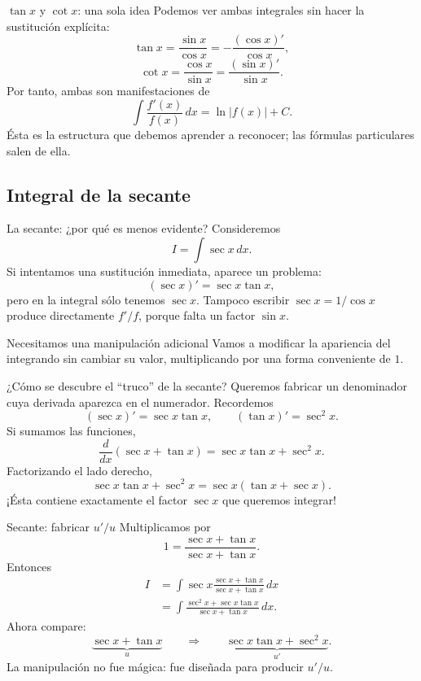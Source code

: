 \documentclass[10pt,aspectratio=169]{beamer}
\begin{document}
\begin{frame}{$\tan x$ y $\cot x$: una sola idea}
Podemos ver ambas integrales sin hacer la sustitución explícita:
\[
\tan x
=\frac{\sin x}{\cos x}
=-\frac{(\cos x)'}{\cos x},
\]
\[
\cot x
=\frac{\cos x}{\sin x}
=\frac{(\sin x)'}{\sin x}.
\]
Por tanto, ambas son manifestaciones de
\[
\boxed{\int\frac{f'(x)}{f(x)}\,dx=\ln|f(x)|+C.}
\]
Ésta es la estructura que debemos aprender a reconocer; las fórmulas particulares salen de ella.
\end{frame}

\subsection{Integral de la secante}
\begin{frame}{La secante: ¿por qué es menos evidente?}
Consideremos
\[
I=\int\sec x\,dx.
\]
Si intentamos una sustitución inmediata, aparece un problema:
\[
(\sec x)'=\sec x\tan x,
\]
pero en la integral sólo tenemos $\sec x$.
\vspace{2mm}
Tampoco escribir $\sec x=1/\cos x$ produce directamente $f'/f$, porque falta un factor $\sin x$.
\begin{alertblock}{Necesitamos una manipulación adicional}
Vamos a modificar la apariencia del integrando sin cambiar su valor, multiplicando por una forma conveniente de $1$.
\end{alertblock}
\end{frame}

\begin{frame}{¿Cómo se descubre el ``truco'' de la secante?}
Queremos fabricar un denominador cuya derivada aparezca en el numerador.
Recordemos
\[
(\sec x)'=\sec x\tan x,
\qquad
(\tan x)'=\sec^2x.
\]
Si sumamos las funciones,
\[
\frac{d}{dx}(\sec x+\tan x)
=\sec x\tan x+\sec^2x.
\]
Factorizando el lado derecho,
\[
\sec x\tan x+\sec^2x
=\sec x(\tan x+\sec x).
\]
¡Ésta contiene exactamente el factor $\sec x$ que queremos integrar!
\end{frame}

\begin{frame}{Secante: fabricar $u'/u$}
Multiplicamos por
\[
1=\frac{\sec x+\tan x}{\sec x+\tan x}.
\]
Entonces
\begin{align*}
I
&=\int\sec x
\frac{\sec x+\tan x}{\sec x+\tan x}\,dx\\[1mm]
&=\int
\frac{\sec^2x+\sec x\tan x}{\sec x+\tan x}\,dx.
\end{align*}
Ahora compare:
\[
\underbrace{\sec x+\tan x}_{u}
\qquad\Longrightarrow\qquad
\underbrace{\sec x\tan x+\sec^2x}_{u'}.
\]
La manipulación no fue mágica: fue diseñada para producir $u'/u$.
\end{frame}
\end{document}
